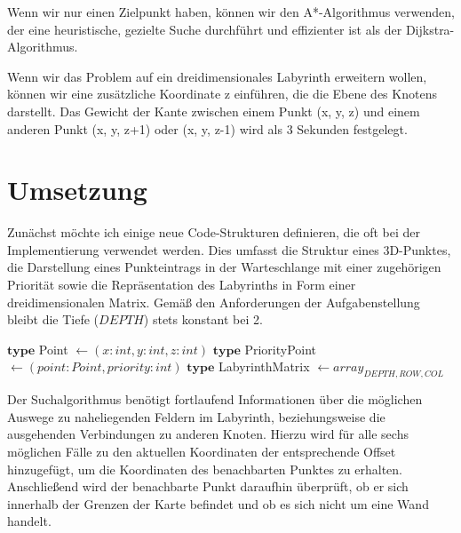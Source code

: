 \documentclass[a4paper,10pt,ngerman]{scrartcl}
\begin{document}
Wenn wir nur einen Zielpunkt haben, können wir den A*-Algorithmus verwenden, der eine heuristische, gezielte Suche durchführt und effizienter ist als der Dijkstra-Algorithmus.

Wenn wir das Problem auf ein dreidimensionales Labyrinth erweitern wollen, können wir eine zusätzliche Koordinate z einführen, die die Ebene des Knotens darstellt. Das Gewicht der Kante zwischen einem Punkt (x, y, z) und einem anderen Punkt (x, y, z+1) oder (x, y, z-1) wird als 3 Sekunden festgelegt.
\section{Umsetzung}

Zunächst möchte ich einige neue Code-Strukturen definieren, die oft bei der Implementierung verwendet werden. Dies umfasst die Struktur eines 3D-Punktes, die Darstellung eines Punkteintrags in der Warteschlange mit einer zugehörigen Priorität sowie die Repräsentation des Labyrinths in Form einer dreidimensionalen Matrix. Gemäß den Anforderungen der Aufgabenstellung bleibt die Tiefe ($DEPTH$) stets konstant bei 2.

\begin{algorithm}
\begin{algorithmic}
 
\State $\textbf{type}$ Point $\gets (x: int, y: int, z: int)$
\State $\textbf{type}$ PriorityPoint $\gets (point: Point, priority: int)$
\State $\textbf{type}$ LabyrinthMatrix $\gets array_{DEPTH,ROW,COL}$
\end{algorithmic}
\end{algorithm}

\vspace{0.5cm}

Der Suchalgorithmus benötigt fortlaufend Informationen über die möglichen Auswege zu naheliegenden Feldern im Labyrinth, beziehungsweise die ausgehenden Verbindungen zu anderen Knoten. 
Hierzu wird für alle sechs möglichen Fälle zu den aktuellen Koordinaten der entsprechende Offset hinzugefügt, um die Koordinaten des benachbarten Punktes zu erhalten. Anschließend wird der benachbarte Punkt daraufhin überprüft, ob er sich innerhalb der Grenzen der Karte befindet und ob es sich nicht um eine Wand handelt.
\end{document}
